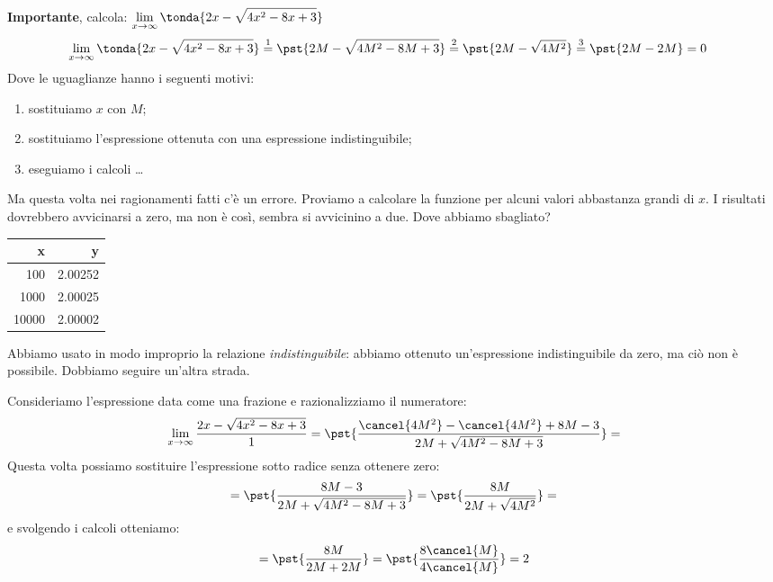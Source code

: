\begin{esempio}
\textbf{Importante}, calcola: \quad 
  \(\displaystyle \lim_{x \rightarrow \infty} \tonda{2x-\sqrt{4x^2-8x+3}}\)
\begin{align*}
\lim_{x \rightarrow \infty} \tonda{2x-\sqrt{4x^2-8x+3}} & \stackrel{1}{=} 
  \pst{2M-\sqrt{4M^2-8M+3}} \stackrel{2}{=}  
  \pst{2M-\sqrt{4M^2}} \stackrel{3}{=} 
  \pst{2M-2M} = 0
\end{align*}
Dove le uguaglianze hanno i seguenti motivi:
\begin{enumerate} [nosep]
 \item sostituiamo \(x\) con \(M\);
 \item sostituiamo l'espressione ottenuta con una espressione 
   indistinguibile;
 \item eseguiamo i calcoli \dots
\end{enumerate}
\vspace{1em}
\begin{minipage}{.69\textwidth}
Ma questa volta nei ragionamenti fatti c'è un errore. Proviamo a calcolare 
la funzione per alcuni valori abbastanza grandi di \(x\).
I risultati dovrebbero avvicinarsi a zero, ma non è così, sembra si 
avvicinino a due. Dove abbiamo sbagliato?
\end{minipage}
\begin{minipage}{.39\textwidth}
\begin{center}
\begin{tabular}{r|r}
x & y\\\hline
100 & 2.00252 \\
1000 & 2.00025 \\
10000 & 2.00002 \\
\end{tabular}
\end{center}
\end{minipage}

Abbiamo usato in modo improprio la relazione \emph{indistinguibile}: 
abbiamo ottenuto un'espressione indistinguibile da zero, ma ciò non è 
possibile. Dobbiamo seguire un'altra strada.

Consideriamo l'espressione data come una frazione e razionalizziamo il 
numeratore:
\[\lim_{x \rightarrow \infty} \frac{2x-\sqrt{4x^2-8x+3}}{1}=
  \pst{\frac{\cancel{4M^2}-\cancel{4M^2}+8M-3}{2M+\sqrt{4M^2-8M+3}}}=\]
Questa volta possiamo sostituire l'espressione sotto radice senza ottenere 
zero:
\[=\pst{\frac{8M-3}{2M+\sqrt{4M^2-8M+3}}} =
   \pst{\frac{8M}{2M+\sqrt{4M^2}}}=\]
e svolgendo i calcoli otteniamo:
\[=\pst{\frac{8M}{2M+2M}}=
   \pst{\frac{8\cancel{M}}{4\cancel{M}}} = 2\]
\end{esempio}

